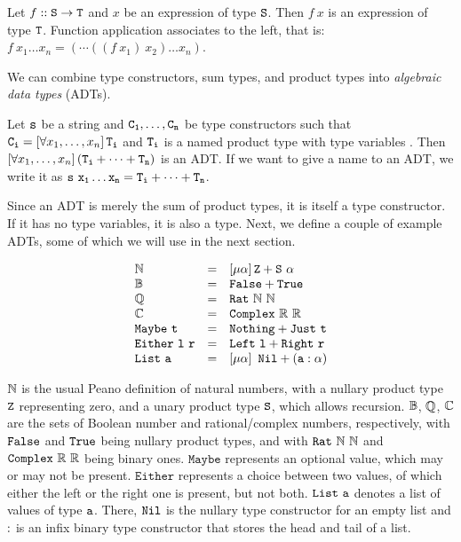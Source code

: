 \begin{definition}
	Let $f :: \mathtt{S} \rightarrow \mathtt{T}$ and $x$ be an expression of type $\mathtt{S}$. Then $f\ x$ is an expression of type $\mathtt{T}$. Function application associates to the left, that is: $f\ x_1 \dots x_n = (\cdots((f\ x_1)\ x_2) \dots x_n)$.
\end{definition}

\noindent
We can combine type constructors, sum types, and product types into {\em algebraic data types} (ADTs).

\begin{definition}\label{def:ADT}
	Let $\mathtt{s}$ be a string and $\mathtt{C_1},\dots,\mathtt{C_n}$ be type constructors such that $\mathtt{C_i} = \left[\forall x_1,\dots,x_n \right] \mathtt{T_i}$ and $\mathtt{T_i}$ is a named product type with type variables . Then $\left[\forall x_1,\dots,x_n \right] (\mathtt{T_i} + \dots + \mathtt{T_n})$ is an ADT. If we want to give a name to an ADT, we write it as $\mathtt{s\ x_1 \dots x_n = T_i + \dots + T_n}$.
\end{definition}

Since an ADT is merely the sum of product types, it is itself a type constructor. If it has no type variables, it is also a type. Next, we define a couple of example ADTs, some of which we will use in the next section.

\begin{example}
	$$
	\begin{array}{l c l}
	\mathbb{N} & = & \left[\mu \alpha \right]\mathtt{Z + S\ \alpha}\\ 
	\mathbb{B} & = & \mathtt{False + True}\\
	\mathbb{Q} & = & \mathtt{Rat}\ \mathbb{N}\ \mathbb{N}\\
	\mathbb{C} & = & \mathtt{Complex}\ \mathbb{R}\ \mathbb{R}\\
	\mathtt{Maybe\ t} & = & \mathtt{Nothing + Just\ t}\\
	\mathtt{Either\ l\ r} & = & \mathtt{Left\ l + Right\ r}\\
	\mathtt{List\ a} & = & \left[\mu \alpha \right]\ \mathtt{Nil + (a : \alpha)}\\
	\end{array}
	$$
	
	$\mathbb{N}$ is the usual Peano definition of natural numbers, with a nullary product type $\mathtt{Z}$ representing zero, and a unary product type $\mathtt{S}$, which allows recursion. $\mathbb{B}$, $\mathbb{Q}$, $\mathbb{C}$ are the sets of Boolean number and rational/complex numbers, respectively, with $\mathtt{False}$ and $\mathtt{True}$ being nullary product types, and with $\mathtt{Rat}\ \mathbb{N}\ \mathbb{N}$ and $\mathtt{Complex}\ \mathbb{R}\ \mathbb{R}$ being binary ones. $\mathtt{Maybe}$ represents an optional value, which may or may not be present. $\mathtt{Either}$ represents a choice between two values, of which either the left or the right one is present, but not both. $\mathtt{List\ a}$  denotes a list of values of type $\mathtt{a}$. There, $\mathtt{Nil}$ is the nullary type constructor for an empty list and $\mathtt{:}$ is an infix binary type constructor that stores the head and tail of a list.
\end{example}

